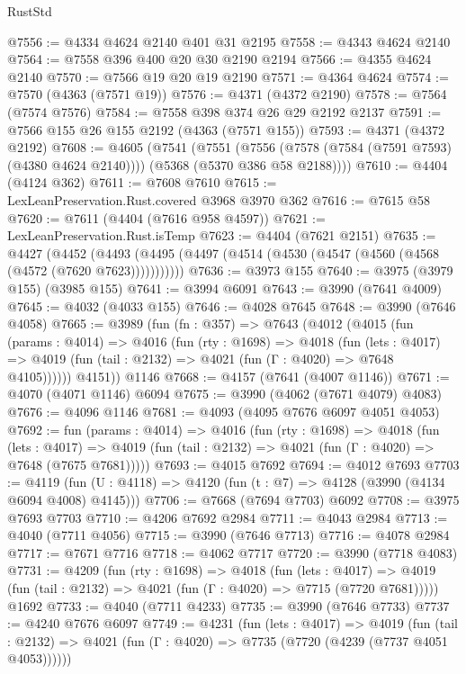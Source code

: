 \begin{lexlean}{RustStd}
\begin{coremodule}
@7556 := @4334 @4624 @2140 @401 @31 @2195
@7558 := @4343 @4624 @2140
@7564 := @7558 @396 @400 @20 @30 @2190 @2194
@7566 := @4355 @4624 @2140
@7570 := @7566 @19 @20 @19 @2190
@7571 := @4364 @4624
@7574 := @7570 (@4363 (@7571 @19))
@7576 := @4371 (@4372 @2190)
@7578 := @7564 (@7574 @7576)
@7584 := @7558 @398 @374 @26 @29 @2192 @2137
@7591 := @7566 @155 @26 @155 @2192 (@4363 (@7571 @155))
@7593 := @4371 (@4372 @2192)
@7608 := @4605
    (@7541
      (@7551
        (@7556 (@7578 (@7584 (@7591 @7593) (@4380 @4624 @2140))))
        (@5368 (@5370 @386 @58 @2188))))
@7610 := @4404 (@4124 @362)
@7611 := @7608 @7610
@7615 := LexLeanPreservation.Rust.covered @3968 @3970 @362
@7616 := @7615 @58
@7620 := @7611 (@4404 (@7616 @958 @4597))
@7621 := LexLeanPreservation.Rust.isTemp
@7623 := @4404 (@7621 @2151)
@7635 := @4427
    (@4452 (@4493 (@4495 (@4497 (@4514 (@4530 (@4547 (@4560 (@4568 (@4572 (@7620 @7623)))))))))))
@7636 := @3973 @155
@7640 := @3975 (@3979 @155) (@3985 @155)
@7641 := @3994 @6091
@7643 := @3990 (@7641 @4009)
@7645 := @4032 (@4033 @155)
@7646 := @4028 @7645
@7648 := @3990 (@7646 @4058)
@7665 := @3989
    (fun (fn : @357) =>
    @7643
      (@4012
        (@4015
          (fun (params : @4014) =>
          @4016
            (fun (rty : @1698) =>
            @4018
              (fun (lets : @4017) =>
              @4019 (fun (tail : @2132) => @4021 (fun (Γ : @4020) => @7648 @4105))))))
        @4151))
    @1146
@7668 := @4157 (@7641 (@4007 @1146))
@7671 := @4070 (@4071 @1146) @6094
@7675 := @3990 (@4062 (@7671 @4079) @4083)
@7676 := @4096 @1146
@7681 := @4093 (@4095 @7676 @6097 @4051 @4053)
@7692 := fun (params : @4014) =>
  @4016
    (fun (rty : @1698) =>
    @4018
      (fun (lets : @4017) =>
      @4019 (fun (tail : @2132) => @4021 (fun (Γ : @4020) => @7648 (@7675 @7681)))))
@7693 := @4015 @7692
@7694 := @4012 @7693
@7703 := @4119 (fun (U : @4118) => @4120 (fun (t : @7) => @4128 (@3990 (@4134 @6094 @4008) @4145)))
@7706 := @7668 (@7694 @7703) @6092
@7708 := @3975 @7693 @7703
@7710 := @4206 @7692 @2984
@7711 := @4043 @2984
@7713 := @4040 (@7711 @4056)
@7715 := @3990 (@7646 @7713)
@7716 := @4078 @2984
@7717 := @7671 @7716
@7718 := @4062 @7717
@7720 := @3990 (@7718 @4083)
@7731 := @4209
    (fun (rty : @1698) =>
    @4018
      (fun (lets : @4017) =>
      @4019 (fun (tail : @2132) => @4021 (fun (Γ : @4020) => @7715 (@7720 @7681)))))
    @1692
@7733 := @4040 (@7711 @4233)
@7735 := @3990 (@7646 @7733)
@7737 := @4240 @7676 @6097
@7749 := @4231
    (fun (lets : @4017) =>
    @4019
      (fun (tail : @2132) => @4021 (fun (Γ : @4020) => @7735 (@7720 (@4239 (@7737 @4051 @4053))))))

\end{coremodule}
\end{lexlean}
